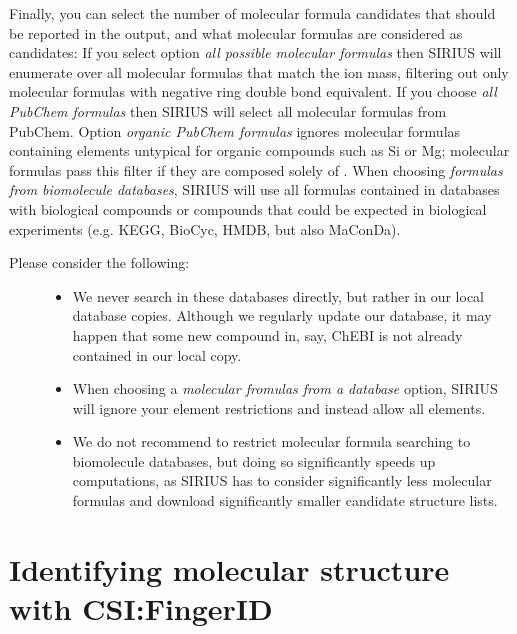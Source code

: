 \documentclass[letterpaper,10pt,openany,oneside]{sphinxmanual}
\newcommand{\todo}[1]{}
\newcommand\gui[1]{\textsl{\guilsinglleft#1\guilsinglright\xspace}}
\begin{document}
Finally, you can select the number of molecular formula candidates that
should be reported in the output, and what molecular formulas are considered
as candidates: If you select option \gui{all possible molecular
formulas} then SIRIUS will enumerate over all molecular formulas that
match the ion mass, filtering out only molecular formulas with negative ring
double bond equivalent. If you choose \gui{all PubChem formulas} then
SIRIUS will select all molecular formulas from PubChem.  Option
\gui{organic PubChem formulas} ignores molecular formulas containing
elements untypical for organic compounds such as Si or Mg; molecular formulas
pass this filter if they are composed solely of .  When
choosing \gui{formulas from biomolecule databases}, \todo{change name of
option in program, biomolecule instead of biological!} SIRIUS will use all
formulas contained in databases with biological compounds or compounds that
could be expected in biological experiments (e.g. KEGG, BioCyc, HMDB, but
also MaConDa).
%
\begin{description}
\item[{Please consider the following:}] \leavevmode\begin{itemize}
\item {} 
We never search in these databases directly, but rather in our local database
copies. Although we regularly update our database, it may happen that some
new compound in, say, ChEBI is not already contained in our local copy.

\item {} 
When choosing a \gui{molecular fromulas from a database} option, SIRIUS
will ignore your element restrictions and instead allow all elements.

\item {} 
We do not recommend to restrict molecular formula searching to biomolecule
databases, but doing so significantly speeds up computations, as SIRIUS has
to consider significantly less molecular formulas and download significantly
smaller candidate structure lists.
\end{itemize}
\end{description}



\section{Identifying molecular structure with CSI:FingerID}
\label{gui:identifying-molecular-structure-with-csi-fingerid}
\end{document}
